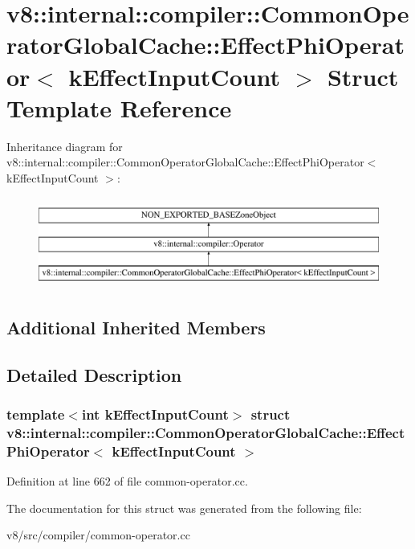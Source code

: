\hypertarget{structv8_1_1internal_1_1compiler_1_1CommonOperatorGlobalCache_1_1EffectPhiOperator}{}\section{v8\+:\+:internal\+:\+:compiler\+:\+:Common\+Operator\+Global\+Cache\+:\+:Effect\+Phi\+Operator$<$ k\+Effect\+Input\+Count $>$ Struct Template Reference}
\label{structv8_1_1internal_1_1compiler_1_1CommonOperatorGlobalCache_1_1EffectPhiOperator}
Inheritance diagram for v8\+:\+:internal\+:\+:compiler\+:\+:Common\+Operator\+Global\+Cache\+:\+:Effect\+Phi\+Operator$<$ k\+Effect\+Input\+Count $>$\+:\begin{figure}[H]
\begin{center}
\leavevmode
\includegraphics[height=3.000000cm]{structv8_1_1internal_1_1compiler_1_1CommonOperatorGlobalCache_1_1EffectPhiOperator}
\end{center}
\end{figure}
\subsection*{Additional Inherited Members}


\subsection{Detailed Description}
\subsubsection*{template$<$int k\+Effect\+Input\+Count$>$\newline
struct v8\+::internal\+::compiler\+::\+Common\+Operator\+Global\+Cache\+::\+Effect\+Phi\+Operator$<$ k\+Effect\+Input\+Count $>$}



Definition at line 662 of file common-\/operator.\+cc.



The documentation for this struct was generated from the following file\+:\begin{DoxyCompactItemize}
\item 
v8/src/compiler/common-\/operator.\+cc\end{DoxyCompactItemize}
